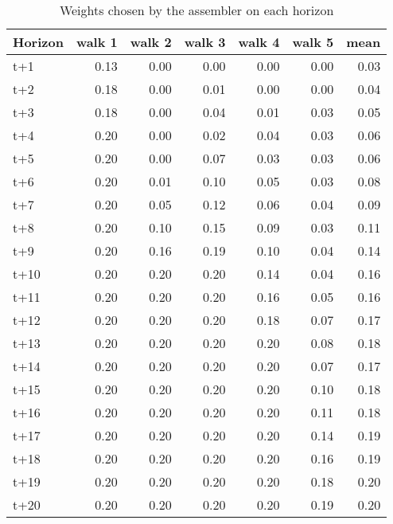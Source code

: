 \begin{table}[H]
\centering
\caption{Weights chosen by the assembler on each horizon}
\label{tab:weights_assembler}
\begin{tabular}{lrrrrrr}
\toprule
Horizon &  walk 1 &  walk 2 &  walk 3 &  walk 4 &  walk 5 &  mean \\
\midrule
t+1  &    0.13 &    0.00 &    0.00 &    0.00 &    0.00 &  0.03 \\
t+2  &    0.18 &    0.00 &    0.01 &    0.00 &    0.00 &  0.04 \\
t+3  &    0.18 &    0.00 &    0.04 &    0.01 &    0.03 &  0.05 \\
t+4  &    0.20 &    0.00 &    0.02 &    0.04 &    0.03 &  0.06 \\
t+5  &    0.20 &    0.00 &    0.07 &    0.03 &    0.03 &  0.06 \\
t+6  &    0.20 &    0.01 &    0.10 &    0.05 &    0.03 &  0.08 \\
t+7  &    0.20 &    0.05 &    0.12 &    0.06 &    0.04 &  0.09 \\
t+8  &    0.20 &    0.10 &    0.15 &    0.09 &    0.03 &  0.11 \\
t+9  &    0.20 &    0.16 &    0.19 &    0.10 &    0.04 &  0.14 \\
t+10 &    0.20 &    0.20 &    0.20 &    0.14 &    0.04 &  0.16 \\
t+11 &    0.20 &    0.20 &    0.20 &    0.16 &    0.05 &  0.16 \\
t+12 &    0.20 &    0.20 &    0.20 &    0.18 &    0.07 &  0.17 \\
t+13 &    0.20 &    0.20 &    0.20 &    0.20 &    0.08 &  0.18 \\
t+14 &    0.20 &    0.20 &    0.20 &    0.20 &    0.07 &  0.17 \\
t+15 &    0.20 &    0.20 &    0.20 &    0.20 &    0.10 &  0.18 \\
t+16 &    0.20 &    0.20 &    0.20 &    0.20 &    0.11 &  0.18 \\
t+17 &    0.20 &    0.20 &    0.20 &    0.20 &    0.14 &  0.19 \\
t+18 &    0.20 &    0.20 &    0.20 &    0.20 &    0.16 &  0.19 \\
t+19 &    0.20 &    0.20 &    0.20 &    0.20 &    0.18 &  0.20 \\
t+20 &    0.20 &    0.20 &    0.20 &    0.20 &    0.19 &  0.20 \\
\bottomrule
\end{tabular}
\end{table}
